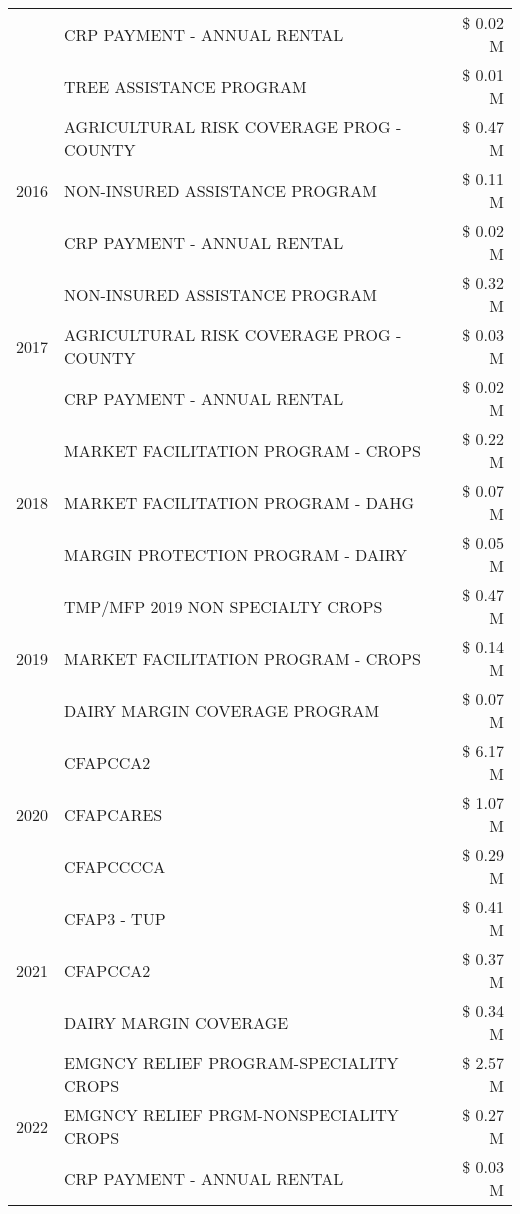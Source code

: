 \begin{tabular}{llr}
 & CRP PAYMENT - ANNUAL RENTAL & \$ 0.02 M \\
 & TREE ASSISTANCE PROGRAM & \$ 0.01 M \\
\cline{1-3}
\multirow[t]{3}{*}{2016} & AGRICULTURAL RISK COVERAGE PROG - COUNTY & \$ 0.47 M \\
 & NON-INSURED ASSISTANCE PROGRAM & \$ 0.11 M \\
 & CRP PAYMENT - ANNUAL RENTAL & \$ 0.02 M \\
\cline{1-3}
\multirow[t]{3}{*}{2017} & NON-INSURED ASSISTANCE PROGRAM & \$ 0.32 M \\
 & AGRICULTURAL RISK COVERAGE PROG - COUNTY & \$ 0.03 M \\
 & CRP PAYMENT - ANNUAL RENTAL & \$ 0.02 M \\
\cline{1-3}
\multirow[t]{3}{*}{2018} & MARKET FACILITATION PROGRAM - CROPS & \$ 0.22 M \\
 & MARKET FACILITATION PROGRAM - DAHG & \$ 0.07 M \\
 & MARGIN PROTECTION PROGRAM - DAIRY & \$ 0.05 M \\
\cline{1-3}
\multirow[t]{3}{*}{2019} & TMP/MFP 2019 NON SPECIALTY CROPS & \$ 0.47 M \\
 & MARKET FACILITATION PROGRAM - CROPS & \$ 0.14 M \\
 & DAIRY MARGIN COVERAGE PROGRAM & \$ 0.07 M \\
\cline{1-3}
\multirow[t]{3}{*}{2020} & CFAPCCA2 & \$ 6.17 M \\
 & CFAPCARES & \$ 1.07 M \\
 & CFAPCCCCA & \$ 0.29 M \\
\cline{1-3}
\multirow[t]{3}{*}{2021} & CFAP3 - TUP & \$ 0.41 M \\
 & CFAPCCA2 & \$ 0.37 M \\
 & DAIRY MARGIN COVERAGE & \$ 0.34 M \\
\cline{1-3}
\multirow[t]{3}{*}{2022} & EMGNCY RELIEF PROGRAM-SPECIALITY CROPS & \$ 2.57 M \\
 & EMGNCY RELIEF PRGM-NONSPECIALITY CROPS & \$ 0.27 M \\
 & CRP PAYMENT - ANNUAL RENTAL & \$ 0.03 M \\
\cline{1-3}
\bottomrule
\end{tabular}
